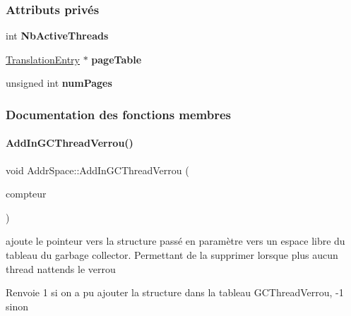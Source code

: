 \subsubsection*{Attributs privés}
\begin{DoxyCompactItemize}
\item 
\hypertarget{class_addr_space_aa3da30f5be78084f881aae4b9e50eda0}{}\label{class_addr_space_aa3da30f5be78084f881aae4b9e50eda0} 
int {\bfseries Nb\+Active\+Threads}
\item 
\hypertarget{class_addr_space_adf07f482066dfc9b526918d4e2cf747a}{}\label{class_addr_space_adf07f482066dfc9b526918d4e2cf747a} 
\hyperlink{class_translation_entry}{Translation\+Entry} $\ast$ {\bfseries page\+Table}
\item 
\hypertarget{class_addr_space_a337a28919411c2ff85837d442a7c86ef}{}\label{class_addr_space_a337a28919411c2ff85837d442a7c86ef} 
unsigned int {\bfseries num\+Pages}
\end{DoxyCompactItemize}


\subsubsection{Documentation des fonctions membres}
\hypertarget{class_addr_space_af63bb5a857c1403fa47b0a55ea989130}{}\label{class_addr_space_af63bb5a857c1403fa47b0a55ea989130} 
\paragraph{\texorpdfstring{Add\+In\+G\+C\+Thread\+Verrou()}{AddInGCThreadVerrou()}}
{\footnotesize\ttfamily void Addr\+Space\+::\+Add\+In\+G\+C\+Thread\+Verrou (\begin{DoxyParamCaption}\item[{struct \hyperlink{structcompteur_verrou}{compteur\+Verrou} $\ast$}]{compteur }\end{DoxyParamCaption})}



ajoute le pointeur vers la structure passé en paramètre vers un espace libre du tableau du garbage collector. Permettant de la supprimer lorsque plus aucun thread n\textquotesingle{}attends le verrou 

\begin{DoxyReturn}{Renvoie}
1 si on a pu ajouter la structure dans la tableau G\+C\+Thread\+Verrou, -\/1 sinon 
\end{DoxyReturn}

